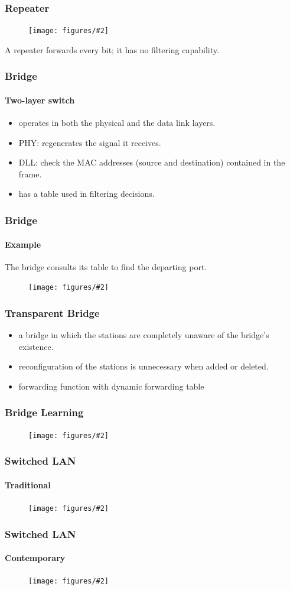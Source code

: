\documentclass{beamer}
\newcommand{\fig}[2]{
\begin{center}
\begin{figure}
\texttt{[image: figures/\#2]}
\end{figure}
\end{center}
}
\begin{document}
   \begin{frame}
\frametitle{\huge Repeater} 
\Large
\fig{0.65}{network_lanhub}
A repeater forwards every bit; it has no filtering capability.
\end{frame}

\begin{frame}
\frametitle{\huge Bridge} 
\framesubtitle{Two-layer switch}
\Large
\begin{itemize} 
\item <1-> operates in both the physical and the data link layers.
\item <2-> PHY: regenerates the signal it receives. 
\item <3-> DLL: check the MAC addresses (source and destination) contained in the frame.
\item <4-> has a table used in filtering decisions.
\end{itemize}
\end{frame}






\begin{frame}
\frametitle{\huge Bridge} 
\framesubtitle{Example}
\Large
The bridge consults its table to find the departing port.
\fig{0.55}{network_bridge}
\end{frame}



\begin{frame}
\frametitle{\huge Transparent Bridge} 
\Large
\begin{itemize} 
\item <1-> a bridge in which the stations are completely unaware of the bridge's existence.
\item <2-> reconfiguration of the stations is unnecessary when added or deleted.
\item <3-> forwarding function with dynamic forwarding table
\end{itemize}
\end{frame}


\begin{frame}
\frametitle{\huge Bridge Learning} 
\fig{0.6}{network_bridge2}
\end{frame}


\begin{frame}
\frametitle{\huge Switched LAN} 
\framesubtitle{Traditional}
\fig{0.5}{network_swlan}
\end{frame}


\begin{frame}
\frametitle{\huge Switched LAN} 
\framesubtitle{Contemporary}
\fig{0.55}{network_swlan2}
\end{frame}
\end{document}

